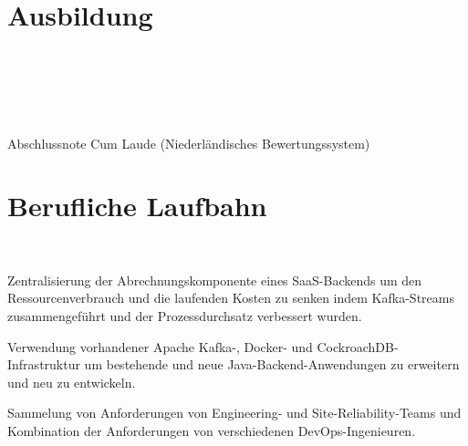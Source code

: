 \documentclass[]{deedy-resume-openfont}
\begin{document}
    
%
%


%
%

\section{Ausbildung}
\raggedright

\\ \\
    
\sectionsep

\\ \\
Abschlussnote Cum Laude (Niederländisches Bewertungssystem)\\

\sectionsep


%
%
\section{Berufliche Laufbahn}

\\ 
\begin{tightemize}
	\item Zentralisierung der Abrechnungskomponente eines SaaS-Backends um den Ressourcenverbrauch und die laufenden Kosten zu senken indem Kafka-Streams zusammengeführt und der Prozessdurchsatz verbessert wurden.
	\item Verwendung vorhandener Apache Kafka-, Docker- und CockroachDB-Infrastruktur um bestehende und neue Java-Backend-Anwendungen zu erweitern und neu zu entwickeln.
	\item Sammelung von Anforderungen von Engineering- und Site-Reliability-Teams und Kombination der Anforderungen von verschiedenen DevOps-Ingenieuren.
\end{tightemize}
\end{document}
